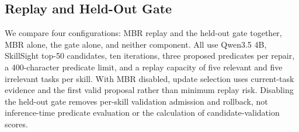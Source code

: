\subsection{Replay and Held-Out Gate}
We compare four configurations: MBR replay and the held-out gate together, MBR alone, the gate alone, and neither component. All use Qwen3.5 4B, SkillSight top-50 candidates, ten iterations, three proposed predicates per repair, a 400-character predicate limit, and a replay capacity of five relevant and five irrelevant tasks per skill. With MBR disabled, update selection uses current-task evidence and the first valid proposal rather than minimum replay risk. Disabling the held-out gate removes per-skill validation admission and rollback, not inference-time predicate evaluation or the calculation of candidate-validation scores.

